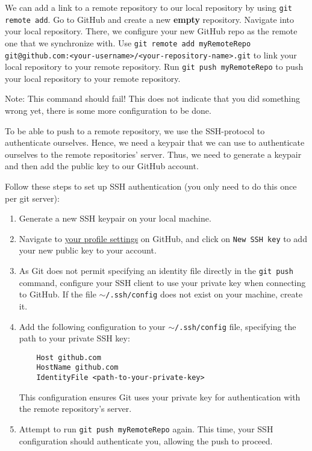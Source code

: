 \documentclass{dcbl/challenge}
\begin{document}
\begin{aufgabe}
    We can add a link to a remote repository to our local repository by using \texttt{git remote add}.
    Go to GitHub and create a new \textbf{empty} repository.
    Navigate into your local repository. There, we configure your new GitHub repo as the remote one that we synchronize with. Use \texttt{git remote add myRemoteRepo git@github.com:<your-username>/<your-repository-name>.git} to link your local repository to your remote repository.
    Run \texttt{git push myRemoteRepo} to push your local repository to your remote repository.
    
    Note: This command should fail! This does not indicate that you did something wrong yet, there is some more configuration to be done.
\end{aufgabe}

\begin{aufgabe}
    To be able to push to a remote repository, we use the SSH-protocol to authenticate ourselves. Hence, we need a keypair that we can use  to authenticate ourselves to the remote repositories' server.
    Thus, we need to generate a keypair and then add the public key to our GitHub account.
    
    Follow these steps to set up SSH authentication (you only need to do this once per git server):
    \begin{enumerate}
    \item Generate a new SSH keypair on your local machine.
    \item Navigate to \href{https://github.com/settings/keys}{your profile settings} on GitHub, and click on \texttt{New SSH key} to add your new public key to your account.
    \item As Git does not permit specifying an identity file directly in the \texttt{git push} command, configure your SSH client to use your private key when connecting to GitHub. If the file \texttt{$\sim$/.ssh/config} does not exist on your machine, create it.
    \item Add the following configuration to your \texttt{$\sim$/.ssh/config} file, specifying the path to your private SSH key:
    \begin{lstlisting}
    Host github.com
    HostName github.com
    IdentityFile <path-to-your-private-key>
    \end{lstlisting}
    This configuration ensures Git uses your private key for authentication with the remote repository's server.
    \item Attempt to run \texttt{git push myRemoteRepo} again. This time, your SSH configuration should authenticate you, allowing the push to proceed.
    \end{enumerate}
\end{aufgabe}
\end{document}
